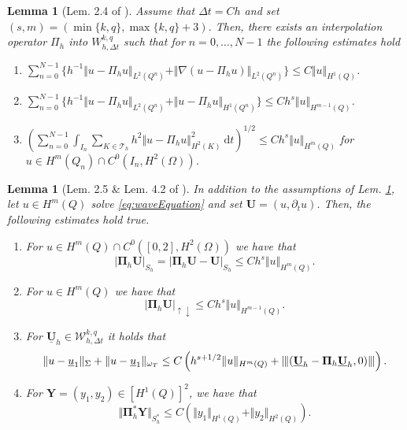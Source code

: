 \documentclass[10pt,reqno]{amsart}
\newtheorem{lem}[thm]{Lemma}
\numberwithin{equation}{section}
\newcommand{\tnorm}[1]{\vert\hspace{-0.3mm}\Vert#1\Vert\hspace{-0.3mm}\vert}
\newcommand{\dT}{\mathrm{d}t}
\newcommand{\FullyDiscrSpace}[2]{ W^{ {#1},{#2}}_{h, \Delta t  } }
\newcommand{\ProdFullyDiscrSpace}[2]{ \mathcal{W}^{ {#1},{#2}}_{h, \Delta t  } }
\newcommand{\Uh}{\underline{\mathbf{U}}_h}
\newcommand{\ul}{\underline{u}}
\begin{document}
\begin{lem}[Lem. 2.4 of \cite{BP24}]\label{lem:interpolationOperator}
    Assume that $\Delta t = Ch$ and set $(s,m) = (\min\{k,q\}, \max\{k,q\}+3)$.
    Then, there exists an interpolation operator $\Pi_h$ into $\FullyDiscrSpace{k}{q}$ such that for $n = 0, \dots, N-1$ the following estimates hold
    \begin{enumerate}
        \item $\sum_{n = 0}^{N-1} \{ h^{-1} \Vert u - \Pi_h u \Vert_{L^2(Q^n)} + \Vert \nabla(u - \Pi_h u) \Vert_{L^2(Q^n)} \} \le C \Vert u \Vert_{H^1(Q)}$. 
        \item $\sum_{n = 0}^{N-1} \{ h^{-1} \Vert u - \Pi_h u \Vert_{L^2(Q^n)} + \Vert u - \Pi_h u \Vert_{H^1(Q^n)} \} \le C h^{s} \Vert u \Vert_{H^{m-1}(Q)}$.
        \item $\left( \sum_{n = 0}^{N-1} \int_{I_n} \sum_{K \in \mathcal{T}_h} h^2 \Vert u - \Pi_h u \Vert^2_{H^2(K)} \ \dT \right)^{1/2} \le C h^{s} \Vert u \Vert_{H^{m}(Q)}$ for $u \in H^m(Q_n) \cap C^0(I_n,H^2(\Omega))$.
    \end{enumerate}
\end{lem}

\begin{lem}[Lem. 2.5 \& Lem. 4.2 of \cite{BP24}]
    In addition to the assumptions of Lem. \ref{lem:interpolationOperator}, let $u \in H^m(Q)$ solve \eqref{eq:waveEquation} and set $\mathbf{U} = (u,\partial_t u)$. Then, the following estimates hold true. 
    \begin{enumerate}
        \item For $u \in H^m(Q) \cap C^0([0,2],H^2(\Omega))$ we have that 
        \begin{equation}
            \vert \mathbf{\Pi}_h \mathbf{U} \vert_{S_h} = \vert \mathbf{\Pi}_h \mathbf{U} - \mathbf{U} \vert_{S_h} \le C h^{s} \Vert u \Vert_{H^m(Q)}.
        \end{equation}
        \item For $u \in H^m(Q)$ we have that
        \begin{equation}
            \vert \mathbf{\Pi}_h \mathbf{U} \vert_{\uparrow \downarrow} \le C h^{s} \Vert u \Vert_{H^{m-1}(Q)}.
        \end{equation}
        \item For $\Uh \in \ProdFullyDiscrSpace{k}{q}$ it holds that 
        \begin{equation}
            \Vert u - \ul_1 \Vert_{\Sigma} + \Vert u - \ul_1 \Vert_{\omega_T} \le C \left( h^{s+1/2} \Vert u \Vert_{H^m(Q)} + \tnorm{(\Uh - \mathbf{\Pi}_h \Uh,0)} \right).
        \end{equation}
        \item For $\mathbf{Y} = (y_1,y_2) \in [H^1(Q)]^2$, we have that
        \begin{equation}
            \Vert \mathbf{\Pi}^\ast_h \mathbf{Y} \Vert_{S_h^\ast} \le C \left( \Vert y_1 \Vert_{H^1(Q)} + \Vert y_2 \Vert_{H^2(Q)} \right). 
        \end{equation}
    \end{enumerate}
\end{lem}
\end{document}
